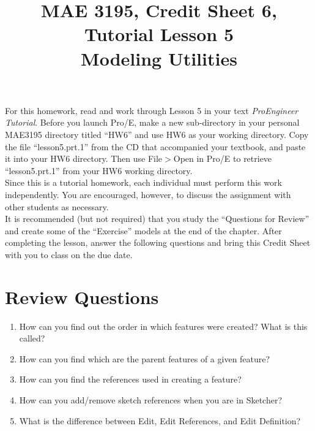 \documentclass[12pt]{article}
\title{MAE 3195, Credit Sheet 6, Tutorial Lesson 5\\
Modeling Utilities}
\date{}
\begin{document}
\maketitle

For this homework, read and work through Lesson 5 in your text \textit{ProEngineer  Tutorial}. Before you launch Pro/E, make a new sub-directory in your personal MAE3195 directory titled ``HW6'' and use HW6 as your working directory. Copy the file ``lesson5.prt.1'' from the CD that accompanied your textbook, and paste it into your HW6 directory. Then use File$>$Open in Pro/E to retrieve ``lesson5.prt.1'' from your HW6 working directory.\\

Since this is a tutorial homework, each individual must perform this work independently. You are encouraged, however, to discuss the assignment with other students as necessary.\\

It is recommended (but not required) that you study the ``Questions for Review'' and create some of the ``Exercise'' models at the end of the chapter. After completing the lesson, answer the following questions and bring this Credit Sheet with you to class on the due date.

\pagebreak

\section*{Review Questions}
\begin{enumerate}
	\item How can you find out the order in which features were created? What is this called?
	\vspace{1.25in}
	\item How can you find which are the parent features of a given feature?
	\vspace{1.25in}
	\item How can you find the references used in creating a feature?
	\vspace{1.25in}
	\item How can you add/remove sketch references when you are in Sketcher?
	\vspace{1.25in}
	\item What is the difference between Edit, Edit References, and Edit Definition?
\end{enumerate}
\end{document}
